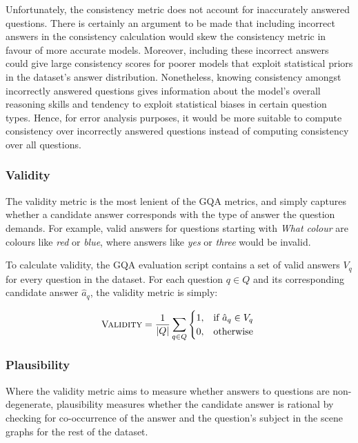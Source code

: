 Unfortunately, the consistency metric does not account for inaccurately answered questions. There is certainly an argument to be made that including incorrect answers in the consistency calculation would skew the consistency metric in favour of more accurate models. Moreover, including these incorrect answers could give large consistency scores for poorer models that exploit statistical priors in the dataset's answer distribution.
Nonetheless, knowing consistency amongst incorrectly answered questions gives information about the model's overall reasoning skills and tendency to exploit statistical biases in certain question types. Hence, for error analysis purposes, it would be more suitable to compute consistency over incorrectly answered questions instead of computing consistency over all questions.


\subsubsection{Validity}

The validity metric is the most lenient of the GQA metrics, and simply captures whether a candidate answer corresponds with the type of answer the question demands. For example, valid answers for questions starting with \textit{What colour} are colours like \textit{red} or \textit{blue}, where answers like \textit{yes} or \textit{three} would be invalid.

To calculate validity, the GQA evaluation script \cite{hudson2019evaluation_script} contains a set of valid answers \(V_q\) for every question in the dataset. For each question \(q \in Q\) and its corresponding candidate answer \(\hat{a}_q\), the validity metric is simply:

\begin{equation}
    \textsc{Validity} = \frac{1}{|Q|}\sum_{q \in Q} \begin{cases}
        1, &\text{if } \hat{a}_q \in V_q\\
        0, &\text{otherwise }\\
    \end{cases}
    \label{equation:validity}
\end{equation}

\subsubsection{Plausibility}

Where the validity metric aims to measure whether answers to questions are non-degenerate, plausibility measures whether the candidate answer is rational by checking for co-occurrence of the answer and the question's subject in the scene graphs for the rest of the dataset.

